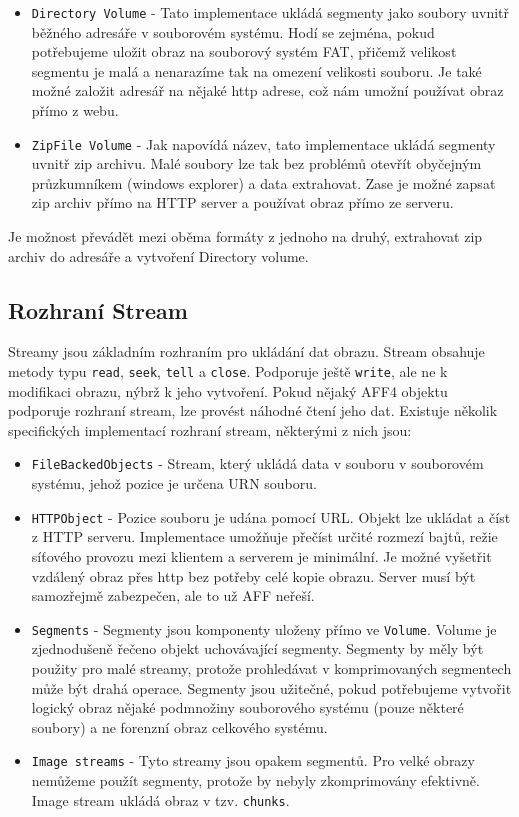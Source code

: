\begin{itemize}
\item \texttt{Directory Volume} - Tato implementace ukládá segmenty jako soubory uvnitř běžného adresáře v souborovém systému. Hodí se zejména, pokud potřebujeme uložit obraz na souborový systém FAT, přičemž velikost segmentu je malá a nenarazíme tak na omezení velikosti souboru. Je také možné založit adresář na nějaké http adrese, což nám umožní používat obraz přímo z webu.

\item \texttt{ZipFile Volume} - Jak napovídá název, tato implementace ukládá segmenty uvnitř zip archivu. Malé soubory lze tak bez problémů otevřít obyčejným průzkumníkem (windows explorer) a data extrahovat. Zase je možné zapsat zip archiv přímo na HTTP server a používat obraz přímo ze serveru.
\end{itemize}

\noindent Je možnost převádět mezi oběma formáty z jednoho na druhý, extrahovat zip archiv do adresáře a vytvoření Directory volume.

\subsection{Rozhraní Stream}
Streamy jsou základním rozhraním pro ukládání dat obrazu. Stream obsahuje metody typu \texttt{read}, \texttt{seek}, \texttt{tell} a \texttt{close}. Podporuje ještě \texttt{write}, ale ne k modifikaci obrazu, nýbrž k jeho vytvoření. Pokud nějaký AFF4 objektu podporuje rozhraní stream, lze provést náhodné čtení jeho dat. Existuje několik specifických implementací rozhraní stream, některými z nich jsou:

\begin{itemize}
\item \texttt{FileBackedObjects} - Stream, který ukládá data v souboru v souborovém systému, jehož pozice je určena URN souboru.

\item \texttt{HTTPObject} - Pozice souboru je udána pomocí URL. Objekt lze ukládat a číst z HTTP serveru. Implementace umožňuje přečíst určité rozmezí bajtů, režie síťového provozu mezi klientem a serverem je minimální. Je možné vyšetřit vzdálený obraz přes http bez potřeby celé kopie obrazu. Server musí být samozřejmě zabezpečen, ale to už AFF neřeší.

\item \texttt{Segments} - Segmenty jsou komponenty uloženy přímo ve \texttt{Volume}. Volume je zjednodušeně řečeno objekt uchovávající segmenty. Segmenty by měly být použity pro malé streamy, protože prohledávat v komprimovaných segmentech může být drahá operace. Segmenty jsou užitečné, pokud potřebujeme vytvořit logický obraz nějaké podmnožiny souborového systému (pouze některé soubory) a ne forenzní obraz celkového systému.

\item \texttt{Image streams} - Tyto streamy jsou opakem segmentů. Pro velké obrazy nemůžeme použít segmenty, protože by nebyly zkomprimovány efektivně. Image stream ukládá obraz v tzv. \texttt{chunks}.
\end{itemize}


